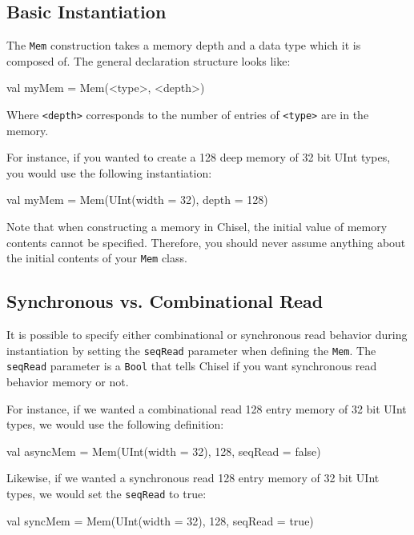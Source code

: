 \subsection{Basic Instantiation}

The \verb+Mem+ construction takes a memory depth and a data type which it is composed of. The general declaration structure looks like:

\begin{scala}
val myMem = Mem(<type>, <depth>)
\end{scala}

Where \verb+<depth>+ corresponds to the number of entries of \verb+<type>+ are in the memory.

For instance, if you wanted to create a 128 deep memory of 32 bit UInt types, you would use the following instantiation:

\begin{scala}
val myMem = Mem(UInt(width = 32), depth = 128)
\end{scala}

Note that when constructing a memory in Chisel, the initial value of memory contents cannot be specified. Therefore, you should never assume anything about the initial contents of your \verb+Mem+ class.

\subsection{Synchronous vs. Combinational Read}

It is possible to specify either combinational or synchronous read behavior during instantiation by setting the \verb+seqRead+ parameter when defining the \verb+Mem+. The \verb+seqRead+ parameter is a \verb+Bool+ that tells Chisel if you want synchronous read behavior memory or not.

For instance, if we wanted a combinational read 128 entry memory of 32 bit UInt types, we would use the following definition:

\begin{scala}
val asyncMem = 
  Mem(UInt(width = 32), 128, seqRead = false)
\end{scala}

Likewise, if we wanted a synchronous read 128 entry memory of 32 bit UInt types, we would set the \verb+seqRead+ to true:

\begin{scala}
val syncMem = 
  Mem(UInt(width = 32), 128, seqRead = true)
\end{scala}

